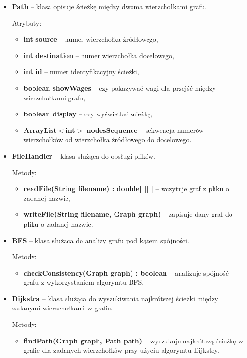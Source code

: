 \documentclass{article}
\begin{document}
\begin{itemize}
\newpage
    
    \item \textbf{Path} -- klasa opisuje ścieżkę między dwoma wierzchołkami grafu.
    
    Atrybuty:
    \begin{itemize}
        \item \textbf{int source} -- numer wierzchołka źródłowego,
        \item \textbf{int destination} -- numer wierzchołka docelowego,
        \item \textbf{int id} -- numer identyfikacyjny ścieżki,
        \item \textbf{boolean showWages} -- czy pokazywać wagi dla przejść między wierzchołkami grafu,
        \item \textbf{boolean display} -- czy wyświetlać ścieżkę,
        \item \textbf{ArrayList$<$int$>$ nodesSequence} -- sekwencja numerów wierzchołków od wierzchołka źródłowego do docelowego.
    \end{itemize}
    
    \item \textbf{FileHandler} -- klasa służąca do obsługi plików.
    
    Metody:
    \begin{itemize}
        \item \textbf{readFile(String filename) : double[ ][ ]} -- wczytuje graf z pliku o zadanej nazwie,
        \item \textbf{writeFile(String filename, Graph graph)} -- zapisuje dany graf do pliku o zadanej nazwie.
    \end{itemize}
    
    \item \textbf{BFS} -- klasa służąca do analizy grafu pod kątem spójności.
    
    Metody:
    \begin{itemize}
        \item \textbf{checkConsistency(Graph graph) : boolean} -- analizuje spójność grafu z wykorzystaniem algorymtu BFS.
    \end{itemize}
    
    \item \textbf{Dijkstra} -- klasa służąca do wyszukiwania najkrótszej ścieżki między zadanymi wierzchołkami w grafie.
    
    Metody:
    \begin{itemize}
        \item \textbf{findPath(Graph graph, Path path)} -- wyszukuje najkrótszą ścieżkę w grafie dla zadanych wierzchołków przy użyciu algorymtu Dijkstry.
    \end{itemize}
\end{itemize}
\end{document}
